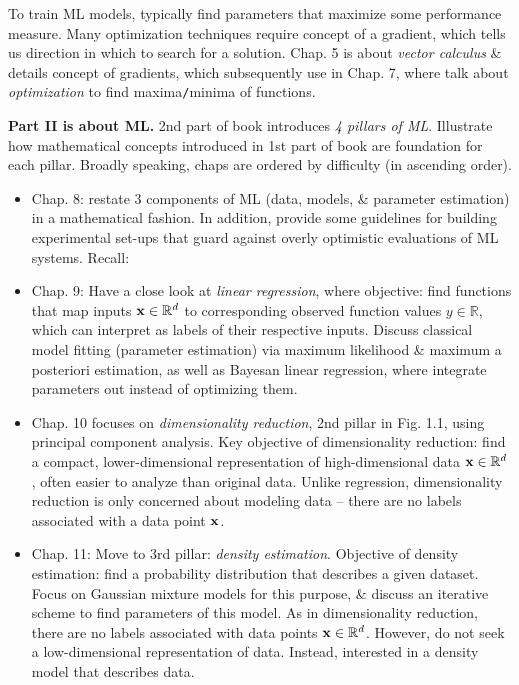 \documentclass{article}
\begin{document}
\begin{itemize}
\begin{itemize}
\begin{itemize}
			To train ML models, typically find parameters that maximize some performance measure. Many optimization techniques require concept of a gradient, which tells us direction in which to search for a solution. Chap. 5 is about {\it vector calculus} \& details concept of gradients, which subsequently use in Chap. 7, where talk about {\it optimization} to find maxima{\tt/}minima of functions.
		\end{itemize}
		{\bf Part II is about ML.} 2nd part of book introduces {\it4 pillars of ML}. Illustrate how mathematical concepts introduced in 1st part of book are foundation for each pillar. Broadly speaking, chaps are ordered by difficulty (in ascending order).
		\begin{itemize}
			\item Chap. 8: restate 3 components of ML (data, models, \& parameter estimation) in a mathematical fashion. In addition, provide some guidelines for building experimental set-ups that guard against overly optimistic evaluations of ML systems. Recall: 
			\item Chap. 9: Have a close look at {\it linear regression}, where objective: find functions that map inputs ${\bf x}\in\mathbb{R}^d$ to corresponding observed function values $y\in\mathbb{R}$, which can interpret as labels of their respective inputs. Discuss classical model fitting (parameter estimation) via maximum likelihood \& maximum a posteriori estimation, as well as Bayesan linear regression, where integrate parameters out instead of optimizing them.
			\item Chap. 10 focuses on {\it dimensionality reduction}, 2nd pillar in Fig. 1.1, using principal component analysis. Key objective of dimensionality reduction: find a compact, lower-dimensional representation of high-dimensional data ${\bf x}\in\mathbb{R}^d$, often easier to analyze than original data. Unlike regression, dimensionality reduction is only concerned about modeling data -- there are no labels associated with a data point ${\bf x}$.
			\item Chap. 11: Move to 3rd pillar: {\it density estimation}. Objective of density estimation: find a probability distribution that describes a given dataset. Focus on Gaussian mixture models for this purpose, \& discuss an iterative scheme to find parameters of this model. As in dimensionality reduction, there are no labels associated with data points ${\bf x}\in\mathbb{R}^d$. However, do not seek a low-dimensional representation of data. Instead, interested in a density model that describes data.

\end{itemize}
\end{itemize}
\end{itemize}
\end{document}
